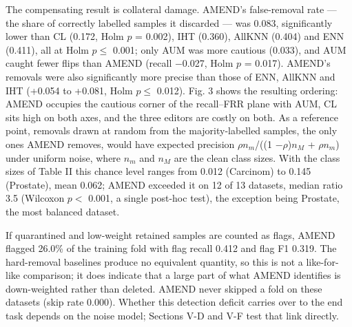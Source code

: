 \documentclass[conference]{IEEEtran}
\begin{document}
The compensating result is collateral damage. AMEND's false-removal rate --- the share of correctly labelled samples it discarded --- was 0.083, significantly lower than CL (0.172, Holm $p$ = 0.002), IHT (0.360), AllKNN (0.404) and ENN (0.411), all at Holm $p \le $ 0.001; only AUM was more cautious (0.033), and AUM caught fewer flips than AMEND (recall $-$0.027, Holm $p$ = 0.017). AMEND's removals were also significantly more precise than those of ENN, AllKNN and IHT (+0.054 to +0.081, Holm $p \le $ 0.012). Fig. 3 shows the resulting ordering: AMEND occupies the cautious corner of the recall--FRR plane with AUM, CL sits high on both axes, and the three editors are costly on both. As a reference point, removals drawn at random from the majority-labelled samples, the only ones AMEND removes, would have expected precision $\rho n_{m}$/((1 $- \rho $)$n_{M}$ + $\rho n_{m}$) under uniform noise, where $n_{m}$ and $n_{M}$ are the clean class sizes. With the class sizes of Table II this chance level ranges from 0.012 (Carcinom) to 0.145 (Prostate), mean 0.062; AMEND exceeded it on 12 of 13 datasets, median ratio 3.5 (Wilcoxon $p <$ 0.001, a single post-hoc test), the exception being Prostate, the most balanced dataset.

If quarantined and low-weight retained samples are counted as flags, AMEND flagged 26.0\% of the training fold with flag recall 0.412 and flag F1 0.319. The hard-removal baselines produce no equivalent quantity, so this is not a like-for-like comparison; it does indicate that a large part of what AMEND identifies is down-weighted rather than deleted. AMEND never skipped a fold on these datasets (skip rate 0.000). Whether this detection deficit carries over to the end task depends on the noise model; Sections V-D and V-F test that link directly.
\end{document}
